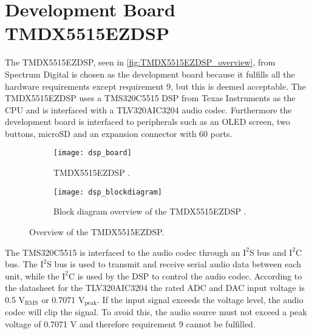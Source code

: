 \section{Development Board TMDX5515EZDSP}

The TMDX5515EZDSP, seen in \autoref{fig:TMDX5515EZDSP_overview}, from Spectrum Digital is chosen as the development board because it fulfills all the hardware requirements except requirement 9, but this is deemed acceptable. The TMDX5515EZDSP uses a TMS320C5515 DSP from Texas Instruments as the CPU and is interfaced with a TLV320AIC3204 audio codec. Furthermore the development board is interfaced to peripherals such as an OLED screen, two buttons, microSD and an expansion connector with 60 ports. 

\begin{figure}[H]
\centering
\begin{subfigure}[t]{0.47\textwidth}
\texttt{[image: dsp\_board]}
	\caption{TMDX5515EZDSP \citep{sou:DSPblock}.}
	\label{fig:TMDX5515EZDSP}
\end{subfigure}
\hspace{6mm} 
\begin{subfigure}[t]{0.35\textwidth}
\texttt{[image: dsp\_blockdiagram]}
	\caption{Block diagram overview of the TMDX5515EZDSP \citep{sou:DSPblock2}.}
	\label{fig:TMDX5515EZDSP_blockdiagram}
\end{subfigure}
\caption{Overview of the TMDX5515EZDSP.}
\label{fig:TMDX5515EZDSP_overview}
\end{figure}

The TMS320C5515 is interfaced to the audio codec through an $\text{I}^2$S bus and $\text{I}^2$C bus. The $\text{I}^2$S bus is used to transmit and receive serial audio data between each unit, while the $\text{I}^2$C is used by the DSP to control the audio codec. According to the datasheet for the TLV320AIC3204 the rated ADC and DAC input voltage is 0.5 $\text{V}_\text{RMS}$ or 0.7071 $\text{V}_\text{peak}$. If the input signal exceeds the voltage level, the audio codec will clip the signal. To avoid this, the audio source must not exceed a peak voltage of 0.7071 V and therefore requirement 9 cannot be fulfilled.















